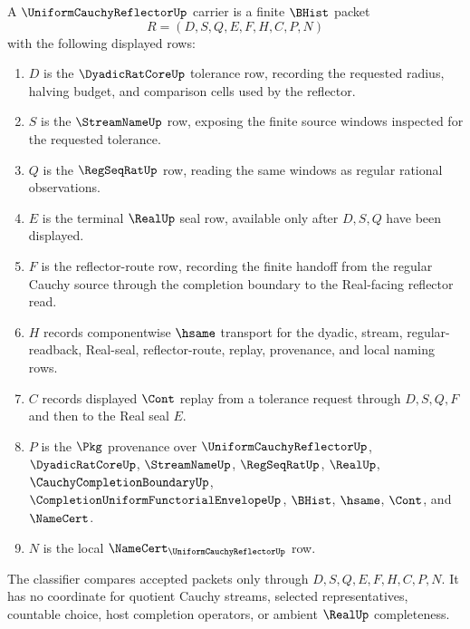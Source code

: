 \begin{definition}
\label{def:uniform-cauchy-reflector-carrier}
A $\UniformCauchyReflectorUp$ carrier is a finite $\BHist$ packet
$$
R=(D,S,Q,E,F,H,C,P,N)
$$
with the following displayed rows:
\begin{enumerate}
\item $D$ is the $\DyadicRatCoreUp$ tolerance row, recording the requested radius, halving budget, and comparison cells used by the reflector.
\item $S$ is the $\StreamNameUp$ row, exposing the finite source windows inspected for the requested tolerance.
\item $Q$ is the $\RegSeqRatUp$ row, reading the same windows as regular rational observations.
\item $E$ is the terminal $\RealUp$ seal row, available only after $D,S,Q$ have been displayed.
\item $F$ is the reflector-route row, recording the finite handoff from the regular Cauchy source through the completion boundary to the Real-facing reflector read.
\item $H$ records componentwise $\hsame$ transport for the dyadic, stream, regular-readback, Real-seal, reflector-route, replay, provenance, and local naming rows.
\item $C$ records displayed $\Cont$ replay from a tolerance request through $D,S,Q,F$ and then to the Real seal $E$.
\item $P$ is the $\Pkg$ provenance over $\UniformCauchyReflectorUp$, $\DyadicRatCoreUp$, $\StreamNameUp$, $\RegSeqRatUp$, $\RealUp$, $\CauchyCompletionBoundaryUp$, $\CompletionUniformFunctorialEnvelopeUp$, $\BHist$, $\hsame$, $\Cont$, and $\NameCert$.
\item $N$ is the local $\NameCert_{\UniformCauchyReflectorUp}$ row.
\end{enumerate}
The classifier compares accepted packets only through $D,S,Q,E,F,H,C,P,N$. It has no coordinate for quotient Cauchy streams, selected representatives, countable choice, host completion operators, or ambient $\RealUp$ completeness.
\end{definition}

